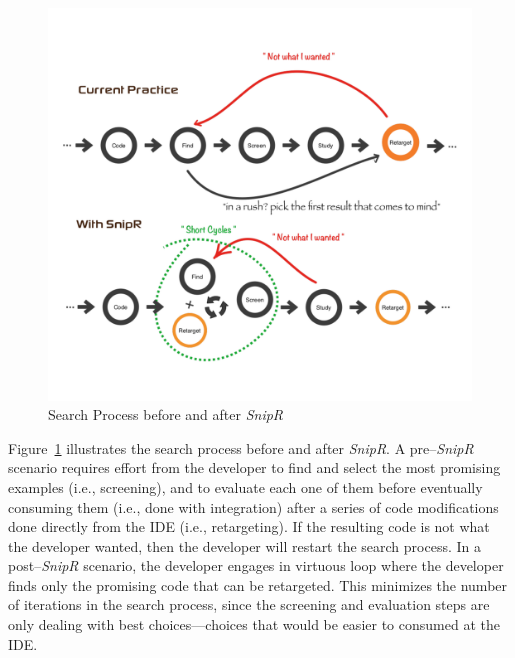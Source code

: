 \begin{figure}[!ht]
    \centering
    \includegraphics[width=\textwidth,height=0.8\textheight,keepaspectratio]{images/searchprocess}
    \caption{Search Process before and after \emph{SnipR}}
    \label{fig:retargeting}
\end{figure}

Figure~\ref{fig:retargeting} illustrates the search process before and after \emph{SnipR}. A pre--\emph{SnipR} scenario requires effort from the developer to find and select the most promising examples (i.e., screening), and to evaluate each one of them before eventually consuming them (i.e., done with integration) after a series of code modifications done directly from the IDE (i.e., retargeting). If the resulting code is not what the developer wanted, then the developer will restart the search process. In a post--\emph{SnipR} scenario, the developer engages in virtuous loop where the developer finds only the promising code that can be retargeted. This minimizes the number of iterations in the search process, since the screening and evaluation steps are only dealing with best choices---choices that would be easier to consumed at the IDE.

